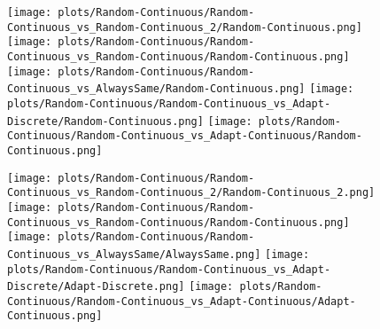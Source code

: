\documentclass{article}
\begin{document}
\begin{itemize}
\begin{figure}[!h]
	\centering
	\begin{minipage}[c]{0.1\textwidth}
		\raggedleft
	\end{minipage}
	\begin{minipage}[c]{0.80\textwidth}
		\texttt{[image: plots/Random-Continuous/Random-Continuous\_vs\_Random-Continuous\_2/Random-Continuous.png]}\hfill
		\texttt{[image: plots/Random-Continuous/Random-Continuous\_vs\_Random-Continuous/Random-Continuous.png]}\hfill
		\texttt{[image: plots/Random-Continuous/Random-Continuous\_vs\_AlwaysSame/Random-Continuous.png]}\hfill
		\texttt{[image: plots/Random-Continuous/Random-Continuous\_vs\_Adapt-Discrete/Random-Continuous.png]}\hfill
		\texttt{[image: plots/Random-Continuous/Random-Continuous\_vs\_Adapt-Continuous/Random-Continuous.png]}\hfill
	\end{minipage}
\end{figure}
\begin{figure}[!h]
	\centering
	\begin{minipage}[c]{0.1\textwidth}
		\raggedleft
	\end{minipage}
	\begin{minipage}[c]{0.80\textwidth}
		\texttt{[image: plots/Random-Continuous/Random-Continuous\_vs\_Random-Continuous\_2/Random-Continuous\_2.png]}\hfill
		\texttt{[image: plots/Random-Continuous/Random-Continuous\_vs\_Random-Continuous/Random-Continuous.png]}\hfill
		\texttt{[image: plots/Random-Continuous/Random-Continuous\_vs\_AlwaysSame/AlwaysSame.png]}\hfill
		\texttt{[image: plots/Random-Continuous/Random-Continuous\_vs\_Adapt-Discrete/Adapt-Discrete.png]}\hfill
		\texttt{[image: plots/Random-Continuous/Random-Continuous\_vs\_Adapt-Continuous/Adapt-Continuous.png]}\hfill
\end{minipage}
\end{figure}
\begin{figure}[!h]
	\centering
	\begin{minipage}[c]{0.1\textwidth}

\end{minipage}
\end{figure}
\end{itemize}
\end{document}
